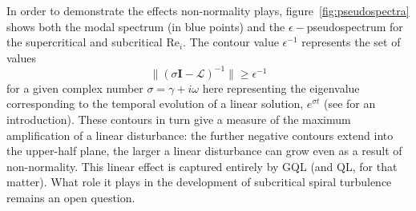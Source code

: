 \documentclass[openacc]{rstransa}%
\newcommand{\Reyn}{\mathrm{Re}}
\newcommand{\Lop}{\mathcal{L}}
\begin{document}
In order to demonstrate the effects non-normality plays, figure~\ref{fig:pseudospectra} shows both the modal spectrum (in blue points) and the $\epsilon-$pseudospectrum for the supercritical and subcritical $\Reyn_i$. The contour value $\epsilon^{-1}$ represents the set of values 
\begin{equation}
    \lVert (\sigma \mathbf{I} - \Lop)^{-1} \rVert \geq \epsilon^{-1}
\end{equation}
for a given complex number $\sigma = \gamma + i\omega$ here representing the eigenvalue corresponding to the temporal evolution of a linear solution, $e^{\sigma t}$ (see \cite{trefethen2005spectra} for an introduction). These contours in turn give a measure of the maximum amplification of a linear disturbance: the further negative contours extend into the upper-half plane, the larger a linear disturbance can grow even as a result of non-normality. This linear effect is captured entirely by GQL (and QL, for that matter). What role it plays in the development of subcritical spiral turbulence remains an open question.
\end{document}
